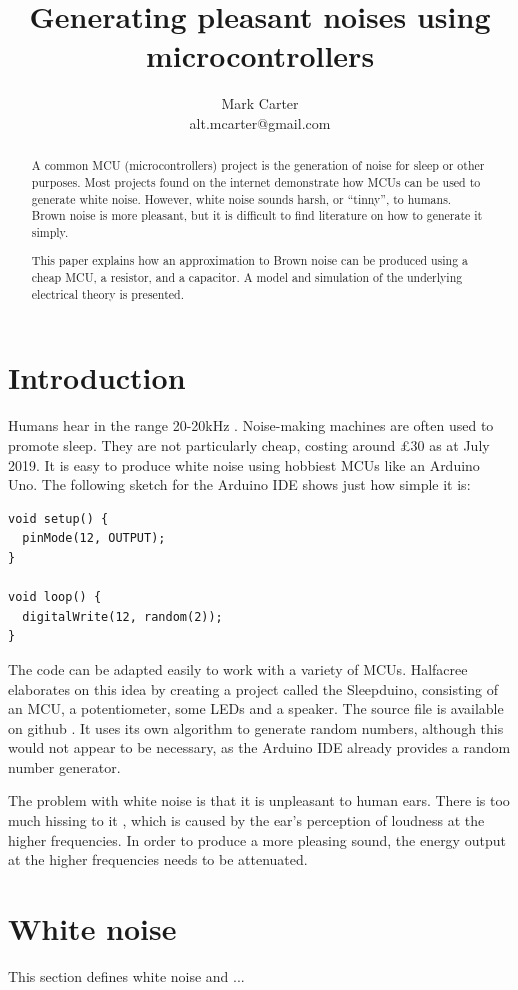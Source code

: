 \documentclass[a4paper,10pt]{article}
\title{Generating pleasant noises using microcontrollers}
\author{Mark Carter \\ alt.mcarter@gmail.com}
\begin{document}
\maketitle
\thispagestyle{fancy}

\begin{abstract}

A common MCU (microcontrollers) project is the generation of noise for sleep or other purposes. Most projects found on the internet demonstrate how MCUs can be used to generate white noise. However, white noise sounds harsh, or ``tinny'', to humans. Brown noise is more pleasant, but it is difficult to find literature on how to generate it simply.

This paper explains how an approximation to Brown noise can be produced using a cheap MCU, a resistor, and a capacitor. A model and simulation of the underlying electrical theory is presented.
\end{abstract}

\section{Introduction}
Humans hear in the range 20-20kHz \cite{wikihearing}. 
Noise-making machines are often used to promote sleep. They are not particularly cheap, costing around £30 as at July 2019. It is easy to produce white noise using hobbiest MCUs like an Arduino Uno. The following sketch for the Arduino IDE shows just how simple it is:
\begin{verbatim}
void setup() {
  pinMode(12, OUTPUT);
}

void loop() {
  digitalWrite(12, random(2));
}
\end{verbatim} 
The code can be adapted easily to work with a variety of MCUs. Halfacree \cite{halfacree} elaborates on this idea by creating a project called the Sleepduino, consisting of an MCU, a potentiometer, some LEDs and a speaker.  The source file is available on github \cite{sleepduino}. It uses its own algorithm to generate random numbers, although this would not appear to be necessary, as the Arduino IDE already provides a random number generator.

The problem with white noise is that it is unpleasant to human ears. There is too much hissing to it \cite{gulf}, which is caused by the ear's perception of loudness at the higher frequencies. In order to produce a more pleasing sound, the energy output at the higher frequencies needs to be attenuated.

\section{White noise}
This section defines white noise and ...
\end{document}
